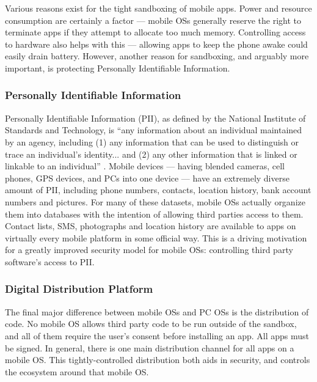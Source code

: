 \documentclass{acm_proc_article-sp}
\begin{document}
Various reasons exist for the tight sandboxing of mobile apps. Power and resource consumption are certainly a factor --- mobile OSs generally reserve the right to terminate apps if they attempt to allocate too much memory. Controlling access to hardware also helps with this --- allowing apps to keep the phone awake could easily drain battery. However, another reason for sandboxing, and arguably more important, is protecting Personally Identifiable Information.

\subsubsection{Personally Identifiable Information}

Personally Identifiable Information (PII), as defined by the National Institute of Standards and Technology, is ``any information about an individual maintained by an agency, including (1) any information that can be used to distinguish or trace an individual's identity... and (2) any other information that is linked or linkable to an individual'' \citep{mccallister2010guide}. Mobile devices --- having blended cameras, cell phones, GPS devices, and PCs into one device --- have an extremely diverse amount of PII, including phone numbers, contacts, location history, bank account numbers and pictures. For many of these datasets, mobile OSs actually organize them into databases with the intention of allowing third parties access to them. Contact lists, SMS, photographs and location history are available to apps on virtually every mobile platform in some official way. This is a driving motivation for a greatly improved security model for mobile OSs: controlling third party software's access to PII. 


\subsubsection{Digital Distribution Platform}

The final major difference between mobile OSs and PC OSs is the distribution of code. No mobile OS allows third party code to be run outside of the sandbox, and all of them require the user's consent before installing an app. All apps must be signed. In general, there is one main distribution channel for all apps on a mobile OS. This tightly-controlled distribution both aids in security, and controls the ecosystem around that mobile OS.
\end{document}
